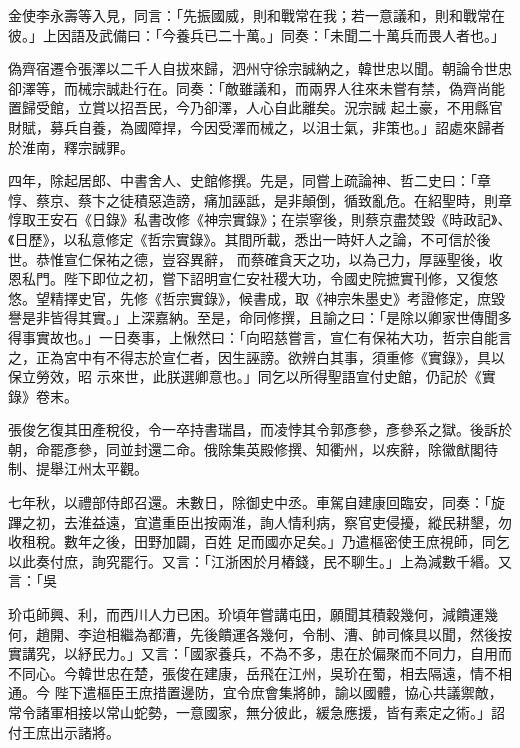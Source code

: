 \begin{pinyinscope}
 金使李永壽等入見，同言：「先振國威，則和戰常在我；若一意議和，則和戰常在彼。」上因語及武備曰：「今養兵已二十萬。」同奏：「未聞二十萬兵而畏人者也。」



 偽齊宿遷令張澤以二千人自拔來歸，泗州守徐宗誠納之，韓世忠以聞。朝論令世忠卻澤等，而械宗誠赴行在。同奏：「敵雖議和，而兩界人往來未嘗有禁，偽齊尚能置歸受館，立賞以招吾民，今乃卻澤，人心自此離矣。況宗誠
 起土豪，不用縣官財賦，募兵自養，為國障捍，今因受澤而械之，以沮士氣，非策也。」詔處來歸者於淮南，釋宗誠罪。



 四年，除起居郎、中書舍人、史館修撰。先是，同嘗上疏論神、哲二史曰：「章惇、蔡京、蔡卞之徒積惡造謗，痛加誣詆，是非顛倒，循致亂危。在紹聖時，則章惇取王安石《日錄》私書改修《神宗實錄》；在崇寧後，則蔡京盡焚毀《時政記》、《日歷》，以私意修定《哲宗實錄》。其間所載，悉出一時奸人之論，不可信於後世。恭惟宣仁保祐之德，豈容異辭，
 而蔡確貪天之功，以為己力，厚誣聖後，收恩私門。陛下即位之初，嘗下詔明宣仁安社稷大功，令國史院摭實刊修，又復悠悠。望精擇史官，先修《哲宗實錄》，候書成，取《神宗朱墨史》考證修定，庶毀譽是非皆得其實。」上深嘉納。至是，命同修撰，且諭之曰：「是除以卿家世傳聞多得事實故也。」一日奏事，上愀然曰：「向昭慈嘗言，宣仁有保祐大功，哲宗自能言之，正為宮中有不得志於宣仁者，因生誣謗。欲辨白其事，須重修《實錄》，具以保立勞效，昭
 示來世，此朕選卿意也。」同乞以所得聖語宣付史館，仍記於《實錄》卷末。



 張俊乞復其田產稅役，令一卒持書瑞昌，而凌悖其令郭彥參，彥參系之獄。後訴於朝，命罷彥參，同並封還二命。俄除集英殿修撰、知衢州，以疾辭，除徽猷閣待制、提舉江州太平觀。



 七年秋，以禮部侍郎召還。未數日，除御史中丞。車駕自建康回臨安，同奏：「旋蹕之初，去淮益遠，宜遣重臣出按兩淮，詢人情利病，察官吏侵擾，縱民耕墾，勿收租稅。數年之後，田野加闢，百姓
 足而國亦足矣。」乃遣樞密使王庶視師，同乞以此奏付庶，詢究罷行。又言：「江浙困於月樁錢，民不聊生。」上為減數千緡。又言：「吳



 玠屯師興、利，而西川人力已困。玠頃年嘗講屯田，願聞其積穀幾何，減饋運幾何，趙開、李迨相繼為都漕，先後饋運各幾何，令制、漕、帥司條具以聞，然後按實講究，以紓民力。」又言：「國家養兵，不為不多，患在於偏聚而不同力，自用而不同心。今韓世忠在楚，張俊在建康，岳飛在江州，吳玠在蜀，相去隔遠，情不相通。今
 陛下遣樞臣王庶措置邊防，宜令庶會集將帥，諭以國體，協心共議禦敵，常令諸軍相接以常山蛇勢，一意國家，無分彼此，緩急應援，皆有素定之術。」詔付王庶出示諸將。




\end{pinyinscope}
